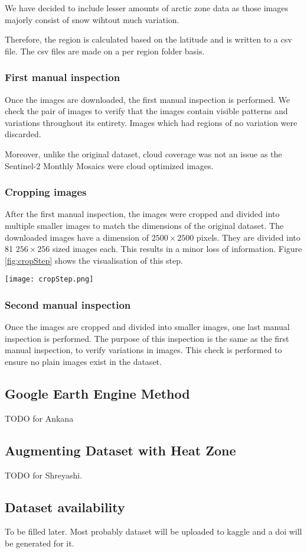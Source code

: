 We have decided to include lesser amounts of arctic zone data as those images majorly consist of snow wihtout much variation.

Therefore, the region is calculated based on the latitude and is written to a csv file. The csv files are made on a per region folder basis.

\subsubsection{First manual inspection}
Once the images are downloaded, the first manual inspection is performed. We check the pair of images to verify that the images contain visible patterns and variations throughout its entirety. Images which had regions of no variation were discarded.

Moreover, unlike the original dataset, cloud coverage was not an issue as the Sentinel-2 Monthly Mosaics were cloud optimized images.

\subsubsection{Cropping images}
After the first manual inspection, the images were cropped and divided into multiple smaller images to match the dimensions of the original dataset. The downloaded images have a dimension of $2500\times2500$ pixels. They are divided into 81 $256\times256$ sized images each. This results in a minor loss of information. Figure \ref{fig:cropStep} shows the visualisation of this step.

\begin{figure*}
    \texttt{[image: cropStep.png]}
    \caption{Image demonstrating the step of cropping and dividing the large image into smaller images.}
    \label{fig:cropStep}
\end{figure*}

\subsubsection{Second manual inspection}
Once the images are cropped and divided into smaller images, one last manual inspection is performed. The purpose of this inspection is the same as the first manual inspection, to verify variations in images. This check is performed to ensure no plain images exist in the dataset.

\subsection{Google Earth Engine Method}
TODO for Ankana

\subsection{Augmenting Dataset with Heat Zone}
TODO for Shreyashi.

\subsection{Dataset availability}
To be filled later. Most probably dataset will be uploaded to kaggle and a doi will be generated for it.